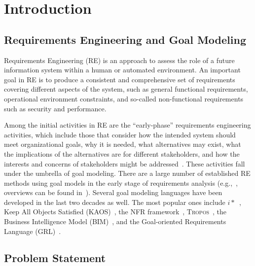 \section{Introduction}
\label{sect:introduction}

\subsection{Requirements Engineering and Goal Modeling}
Requirements Engineering (RE) is an approach to assess the role of a future information system within a human or automated environment. An important goal in RE is to produce a consistent and comprehensive set of requirements covering different aspects of the system, such as general functional requirements, operational environment constraints, and so-called non-functional requirements such as security and performance. 

Among the initial activities in RE are the ``early-phase'' requirements engineering activities, which include those that consider how the intended system should meet organizational goals, why it is needed, what alternatives may exist, what the implications of the alternatives are for different stakeholders, and how the interests and concerns of stakeholders might be addressed~\cite{yu1997towards}. These activities fall under the umbrella of goal modeling. There are a large number of established RE methods using goal models in the early stage of requirements analysis (e.g.,~\cite{liu2004designing,donzelli2004goal,dardenne1993goal,chung2012non,castro2002towards}, overviews can be found in~\cite{van2001goal,kavakliL05}). Several goal modeling languages have been developed in the last two decades as well. The most popular ones include $i*$~\cite{Yu:1997:TMR:827255.827807}, Keep All Objects Satisfied (KAOS)~\cite{van2008requirements}, the NFR framework~\cite{chung2012non}, \textsc{Tropos}~\cite{giorgini2005goal}, the Business Intelligence Model (BIM)~\cite{horkoff2014strategic}, and the Goal-oriented Requirements Language (GRL)~\cite{Amyot:2010:EGM:1841349.1841356}.

\subsection{Problem Statement}
\label{sect:problem_statement}


